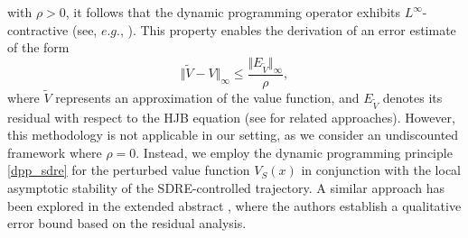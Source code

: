 \documentclass{article}
\begin{document}
with $\rho>0$, it follows that the dynamic programming operator exhibits $L^\infty$-contractive (see, $e.g.$, \cite{dolcetta1983discrete}). This property enables the derivation of an error estimate of the form
$$
\Vert \tilde{V} - V \Vert_{\infty} \le \frac{\Vert E_{\tilde{V}} \Vert_{\infty}}{\rho},
$$
where $\tilde{V}$ represents an approximation of the value function, and $E_{\tilde{V}}$ denotes its residual with respect to the HJB equation (see \cite{grune1997adaptive,albert2002posteriori} for related approaches). However, this methodology is not applicable in our setting, as we consider an undiscounted framework where $\rho = 0$. Instead, we employ the dynamic programming principle \eqref{dpp_sdre} for the perturbed value function $V_S(x)$ in conjunction with the local asymptotic stability of the SDRE-controlled trajectory. A similar approach has been explored in the extended abstract \cite{grune2018hamiltonian}, where the authors establish a qualitative error bound based on the residual analysis.
\end{document}
